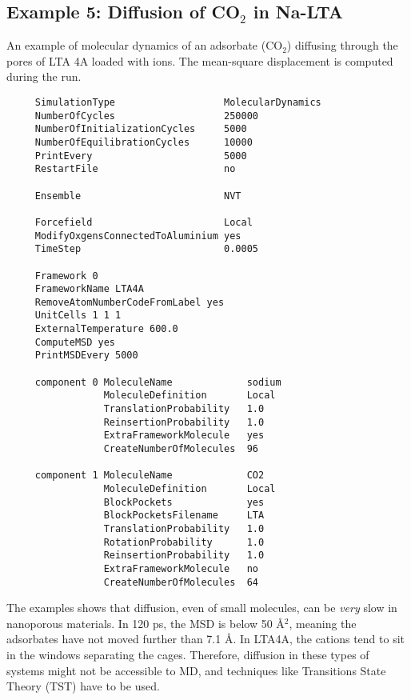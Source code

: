 \subsection*{Example 5: Diffusion of CO$_2$ in Na-LTA}

An example of molecular dynamics of an adsorbate (CO$_2$) diffusing through the pores of LTA 4A loaded with ions.
The mean-square displacement is computed during the run.

\begin{tiny}
\begin{verbatim}
     SimulationType                   MolecularDynamics
     NumberOfCycles                   250000
     NumberOfInitializationCycles     5000
     NumberOfEquilibrationCycles      10000
     PrintEvery                       5000
     RestartFile                      no

     Ensemble                         NVT

     Forcefield                       Local
     ModifyOxgensConnectedToAluminium yes
     TimeStep                         0.0005

     Framework 0
     FrameworkName LTA4A
     RemoveAtomNumberCodeFromLabel yes
     UnitCells 1 1 1
     ExternalTemperature 600.0
     ComputeMSD yes
     PrintMSDEvery 5000

     component 0 MoleculeName             sodium
                 MoleculeDefinition       Local
                 TranslationProbability   1.0
                 ReinsertionProbability   1.0
                 ExtraFrameworkMolecule   yes
                 CreateNumberOfMolecules  96

     component 1 MoleculeName             CO2
                 MoleculeDefinition       Local
                 BlockPockets             yes
                 BlockPocketsFilename     LTA
                 TranslationProbability   1.0
                 RotationProbability      1.0
                 ReinsertionProbability   1.0
                 ExtraFrameworkMolecule   no
                 CreateNumberOfMolecules  64
\end{verbatim}
\end{tiny}

\noindent
The examples shows that diffusion, even of small molecules, can be \emph{very} slow in nanoporous materials.
In 120 ps, the MSD is below 50 \AA$^2$, meaning the adsorbates have not moved further than 7.1 \AA.
In LTA4A, the cations tend to sit in the windows separating the cages.
Therefore, diffusion in these types of systems might not be accessible to MD, and techniques like Transitions State Theory (TST)
have to be used.

